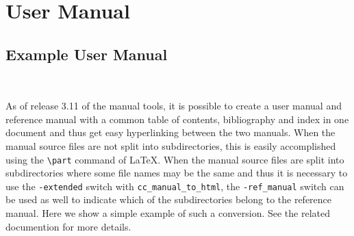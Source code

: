\ccNumberChaptersByPart

\part{User Manual}

\chapter{Example User Manual}
\\

As of release 3.11 of the manual tools, it is possible to create a user manual 
and reference manual with a common table of contents, bibliography and index 
in one document and thus get easy hyperlinking between the two manuals.  
When the manual source files are not split into subdirectories,
this is easily accomplished using the \verb|\part| command of
\LaTeX.  When the manual source files are split into subdirectories
where some file names may be the same and thus it is necessary to use the 
{\tt -extended} switch with {\tt cc\_manual\_to\_html}, the {\tt -ref\_manual} 
switch can be used as well to indicate which of the subdirectories belong
to the reference manual.  Here we show a simple example of such a
conversion.  See the related documention for more details.

